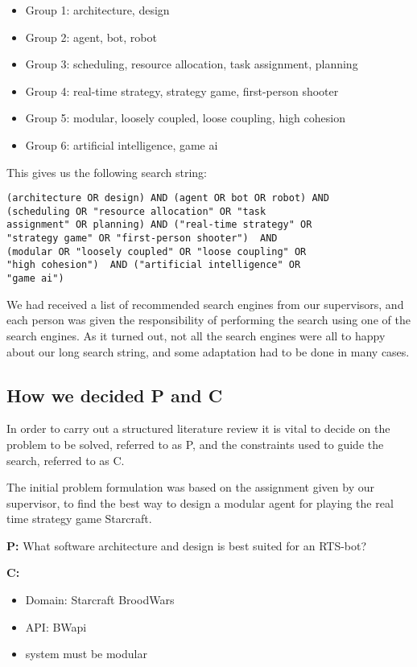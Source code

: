 \begin{itemize}

\item Group 1: architecture, design
\item Group 2: agent, bot, robot
\item Group 3: scheduling, resource allocation, task assignment, planning
\item Group 4: real-time strategy, strategy game, first-person shooter
\item Group 5: modular, loosely coupled, loose coupling, high cohesion
\item Group 6: artificial intelligence, game ai

\end{itemize}
This gives us the following search  string:
\begin{lstlisting}
(architecture OR design) AND (agent OR bot OR robot) AND 
(scheduling OR "resource allocation" OR "task 
assignment" OR planning) AND ("real-time strategy" OR 
"strategy game" OR "first-person shooter")  AND 
(modular OR "loosely coupled" OR "loose coupling" OR 
"high cohesion")  AND ("artificial intelligence" OR 
"game ai")
\end{lstlisting}
We had received a list of recommended search engines from our supervisors, and each person was given the responsibility of performing the search using one of the search engines. As it turned out, not all the search engines were all to happy about our long search string, and some adaptation had to be done in many cases.

\subsection{How we decided P and C}
\label{sub:how_we_decided_p_and_c}
In order to carry out a structured literature review it is vital to decide on the problem to be solved, referred to as P, and the constraints used to guide the search, referred to as C.

The initial problem formulation was based on the assignment given by our supervisor, to find the best way to design a modular agent for playing the real time strategy game Starcraft.  

\textbf{P:} What software architecture and design is best suited for an RTS-bot?

\textbf{C:}
\begin{itemize}
\item Domain: Starcraft BroodWars
\item API: BWapi
\item system must be modular	
\end{itemize}

